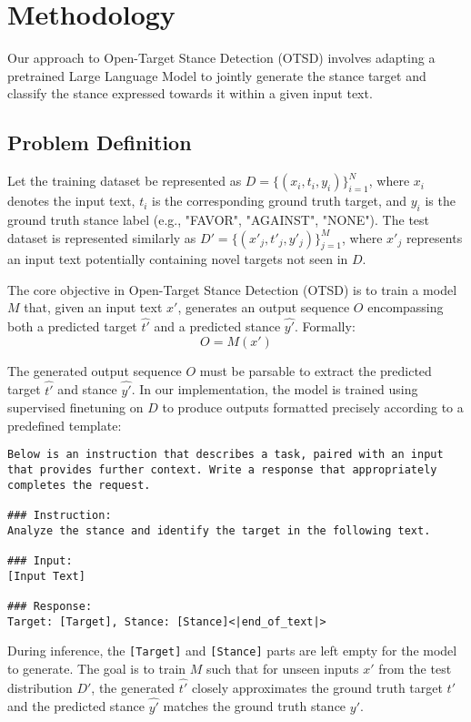 \documentclass[twocolumn,11pt,letterpaper]{article}
\begin{document}
\section{Methodology}
\label{sec:methodology}

Our approach to Open-Target Stance Detection (OTSD) involves adapting a pretrained Large Language Model to jointly generate the stance target and classify the stance expressed towards it within a given input text.

\subsection{Problem Definition}
\label{sec:problem_definition}

Let the training dataset be represented as $D = \{(x_i, t_i, y_i)\}_{i=1}^{N}$, where $x_i$ denotes the input text, $t_i$ is the corresponding ground truth target, and $y_i$ is the ground truth stance label (e.g., "FAVOR", "AGAINST", "NONE"). The test dataset is represented similarly as $D' = \{(x'_j, t'_j, y'_j)\}_{j=1}^{M}$, where $x'_j$ represents an input text potentially containing novel targets not seen in $D$.

The core objective in Open-Target Stance Detection (OTSD) is to train a model $M$ that, given an input text $x'$, generates an output sequence $O$ encompassing both a predicted target $\hat{t'}$ and a predicted stance $\hat{y'}$.
Formally:
\[ O = M(x') \]

The generated output sequence $O$ must be parsable to extract the predicted target $\hat{t'}$ and stance $\hat{y'}$. In our implementation, the model is trained using supervised finetuning on $D$ to produce outputs formatted precisely according to a predefined template:

\begin{lstlisting}[basicstyle=\small\ttfamily,columns=flexible,breaklines=true,breakatwhitespace=true,frame=single]
Below is an instruction that describes a task, paired with an input that provides further context. Write a response that appropriately completes the request.

### Instruction:
Analyze the stance and identify the target in the following text.

### Input:
[Input Text]

### Response:
Target: [Target], Stance: [Stance]<|end_of_text|>
\end{lstlisting}

During inference, the \texttt{[Target]} and \texttt{[Stance]} parts are left empty for the model to generate. The goal is to train $M$ such that for unseen inputs $x'$ from the test distribution $D'$, the generated $\hat{t'}$ closely approximates the ground truth target $t'$ and the predicted stance $\hat{y'}$ matches the ground truth stance $y'$.
\end{document}
